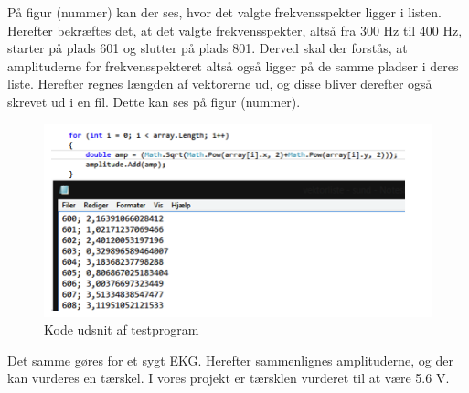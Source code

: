 På figur (nummer) kan der ses, hvor det valgte frekvensspekter ligger i listen. Herefter bekræftes det, at det valgte frekvensspekter, altså fra 300 Hz til 400 Hz, starter på plads 601 og slutter på plads 801. Derved skal der forstås, at amplituderne for frekvensspekteret altså også ligger på de samme pladser i deres liste. Herefter regnes længden af vektorerne ud, og disse bliver derefter også skrevet ud i en fil. Dette kan ses på figur (nummer). 


\begin{figure}[H]
	\centering
	\includegraphics[width=1\textwidth]{Figurer/Snip20150520_13}
	\caption{Kode udsnit af testprogram}
\end{figure}

Det samme gøres for et sygt EKG. Herefter sammenlignes amplituderne, og der kan vurderes en tærskel. I vores projekt er tærsklen vurderet til at være 5.6 V. 





